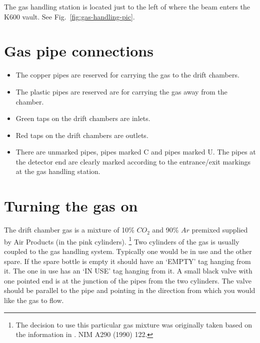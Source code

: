 \documentclass[11pt]{report}
\begin{document}
The gas handling station is located just to the left of where the
beam enters the K600 vault.
See Fig.~\ref{fig:gas-handling-pic}.


\section{Gas pipe connections}
\begin{itemize}
\item The copper pipes are reserved for carrying the gas to the drift chambers. 
\item The plastic pipes are reserved are for carrying the gas away from the chamber.
\item Green taps on the drift chambers are inlets.
\item Red taps on the drift chambers are outlets.
\item There are unmarked pipes, pipes marked C and pipes marked U. The pipes at the
detector end are clearly marked according to the entrance/exit markings at the gas handling station.
\end{itemize}



\section{Turning the gas on}

The drift chamber gas is a mixture of 10\% $CO_{2}$  and 90\% $Ar$ premixed 
supplied by Air Products (in the pink cylinders). 
\footnote{The decision to use this particular gas mixture was originally taken based on the information in \cite{But90}. NIM A290 (1990) 122.}
Two cylinders of the gas 
is usually coupled to the gas handling  system. Typically one would be in 
use and the other spare. If the spare bottle is empty it should have an 
`EMPTY' tag hanging from it. The one in use has an `IN USE' tag hanging 
from it. A small black valve with one pointed end is at the junction of the 
pipes from the two cylinders. The valve should be parallel to the pipe and
pointing in the direction from which you would like the gas to flow.

\bigskip
{}
\end{document}
